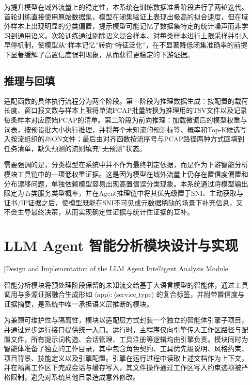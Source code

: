 为提升模型在域外流量上的稳定性，本系统在训练数据准备阶段进行了两轮迭代。首轮训练直接使用原始数据集，模型在闭集验证上表现出极高的拟合速度，但在域外样本上出现明显的分类偏置，提示模型可能记忆了数据集特定的统计噪声而非学习到通用语义。次轮训练通过剔除语义混合样本、对每类样本进行上限采样并引入早停机制，使模型从“样本记忆”转向“特征泛化”，在不显著降低闭集准确率的前提下显著缓解了高置信度误判现象，从而获得更稳定的下游证据。

\subsection{推理与回填}

适配函数的具体执行流程分为两个阶段。第一阶段为推理数据生成：按配置的载荷长度、窗口报文数与样本上限将单流PCAP批量转换为推理用的TSV文件以及记录每条样本对应原始PCAP的清单。第二阶段为前向推理：加载微调后的模型权重与词表，按预设批大小执行推理，并将每个未知流的预测标签、概率和Top-K候选写入按流组织的JSON文件；最后由对齐函数按流序号与PCAP路径两种方式回填到任务清单，缺失预测的流则填充“无预测”状态。

需要强调的是，分类模型在系统中并不作为最终判定依据，而是作为下游智能分析模块工具链中的一项低权重证据。这是因为模型在域外流量上仍存在置信度偏置和分布漂移问题，单独依赖模型容易出现高置信误分类现象。本系统通过将模型输出限定为五类服务类型概率，并在Agent推理链中将其优先级置于SNI、主动获取与证书/IP证据之后，使模型既能在SNI不可见或元数据稀缺的场景下补充信息，又不会主导最终决策，从而实现确定性证据与统计性证据的互补。

\section{LLM Agent 智能分析模块设计与实现}[Design and Implementation of the LLM Agent Intelligent Analysis Module]

智能分析模块将预处理阶段保留的未知流交给基于大语言模型的智能体，通过工具调用与多源证据融合生成形如 $\langle \mathrm{app} \rangle\!:\!\langle \mathrm{service\_type} \rangle$ 的复合标签，并附带置信度与证据摘要，是系统中唯一承担语义层推断的模块。

为兼顾可维护性与隔离性，模块以适配层方式封装一个独立的智能体引擎子项目，并通过异步运行接口提供统一入口。运行时，主程序仅向引擎传入工作区路径与配置文件，所有提示词构造、会话管理、工具注册等逻辑均由引擎负责。模块同时为智能体准备了独立的工作目录，其中包含角色契约、工具优先级说明、风格约束、项目背景、技能定义以及引擎配置。引擎在运行过程中读取上述文档作为上下文，并在隔离工作区下完成会话与缓存写入，其文件操作通过工作区写入约束选项被严格限制，避免对系统其他目录造成意外修改。

